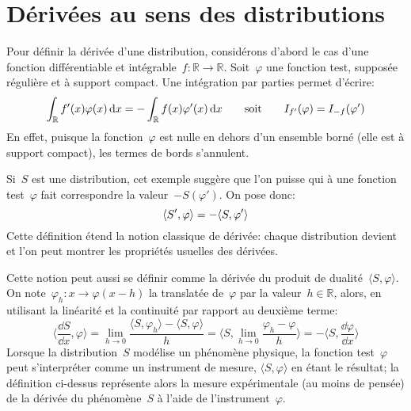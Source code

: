 \medskip
\section{Dérivées au sens des distributions}
Pour définir la dérivée d'une distribution, considérons d'abord le cas d'une fonction différentiable
et intégrable~$f:\mathbb{R}\rightarrow\mathbb{R}$.
Soit~$\varphi$ une fonction test, supposée régulière et à support compact.
Une intégration par parties permet d'écrire:
\begin{equation}
  \int_{\mathbb R} f'(x) \varphi(x)\,\text{d} x = -\int_{\mathbb R} f(x)\varphi'(x)\,\text{d} x \qquad\text{soit}\qquad I_{f'}(\varphi)=I_{-f}(\varphi')
\end{equation}
En effet, puisque la fonction~$\varphi$ est nulle en dehors d'un ensemble borné (elle est à support
compact), les termes de bords s'annulent.

\medskip
\begin{definition}
Si~$S$ est une distribution, cet exemple suggère que l'on puisse  qui à une fonction test~$\varphi$ fait correspondre la valeur~$- S(\varphi')$.
On pose donc:
\begin{equation}\colorred
  \langle S', \varphi \rangle = - \langle S, \varphi' \rangle
\end{equation}
Cette définition étend la notion classique de dérivée:
chaque distribution devient  et l'on peut montrer les
propriétés usuelles des dérivées.
\end{definition}

\medskip
Cette notion peut aussi se définir comme la dérivée du produit de dualité~$\langle S,\varphi\rangle$.
On note~$\varphi_h:x\rightarrow\varphi(x-h)$ la translatée de~$\varphi$ par la valeur~$h\in{\mathbb R}$,
alors, en utilisant la linéarité et la continuité par rapport au deuxième terme:
\begin{equation}
\langle\frac{\dd S}{\dd x},\varphi\rangle= \lim_{h\rightarrow 0}\frac{ \langle S,\varphi_h\rangle- \langle S,\varphi\rangle}{h}
= \langle S,\lim_{h\rightarrow 0} \frac{\varphi_h-\varphi}{h} \rangle= -\langle S,\frac{\dd\varphi}{\dd x}\rangle
\end{equation}
Lorsque la distribution~$S$ modélise un phénomène physique, la fonction test~$\varphi$ peut
s'interpréter comme un instrument de mesure, $\langle S,\varphi\rangle$ en étant le résultat;
la définition ci-dessus représente alors la mesure expérimentale (au moins de pensée) de la
dérivée du phénomène~$S$ à l'aide de l'instrument~$\varphi$.

